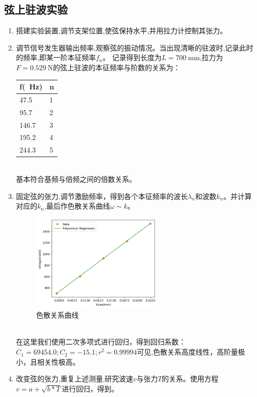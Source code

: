 \documentclass[UTF8]{ctexart}
\begin{document}
\subsection{弦上驻波实验}
\begin{enumerate}
\item 搭建实验装置,调节支架位置,使弦保持水平,并用拉力计控制其张力。
\item 调节信号发生器输出频率,观察弦的振动情况。当出现清晰的驻波时,记录此时的频率,即某一阶本征频率$f_n$。
 记录得到长度为$L=\SI{700}{\milli \meter}$,拉力为$F = \SI{0.529}{\newton}$的弦上驻波的本征频率与阶数的关系为：
 \begin{table}[htbp]
    \centering
\begin{tabular}{|l|l|}
   
f(\SI{}{\hertz}) &n\\
\hline 
47.5&1\\
95.7&2\\
146.7&3\\
195.2&4\\
244.3&5\\
\end{tabular}
\end{table}
\\
基本符合基频与倍频之间的倍数关系。
\item 固定弦的张力,调节激励频率，得到各个本征频率的波长$\lambda_n$和波数$k_n$。并计算对应的$k_n$,最后作色散关系曲线$\omega \sim k$。
\\
\begin{figure}[htbp]
    \centering
    \includegraphics[width=0.6\textwidth]{dispersion_curve.png}
    \caption{色散关系曲线}
    \label{fig:dispersion_curve}
\end{figure}
\\
在这里我们使用二次多项式进行回归，得到回归系数：$ C_1 = 69454.0;C_2 = -15.1; r^2 = 0.99994$可见,色散关系高度线性，高阶量极小，且相关性极高。
\item 改变弦的张力,重复上述测量,研究波速$v$与张力$T$的关系。使用方程$v = a + \sqrt{b * T}$进行回归，得到。

\end{enumerate}
\end{document}
